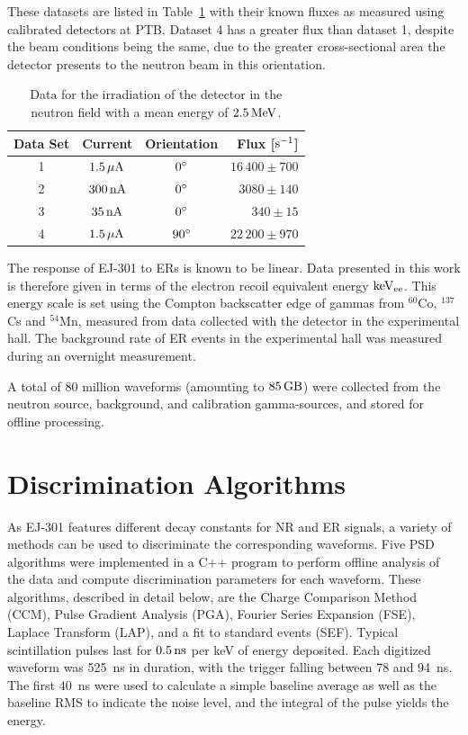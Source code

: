 These datasets are listed in Table~\ref{tab:psd_datasets} with their known fluxes as measured using calibrated detectors at PTB. Dataset 4 has a greater flux than dataset 1, despite the beam conditions being the same, due to the greater cross-sectional area the detector presents to the neutron beam in this orientation.

\begin{table}[htbp]
    \caption{Data for the irradiation of the detector in the neutron field with a mean energy of $2.5\,\mathrm{MeV}$. }\label{tab:psd_datasets}
\centering
    \begin{tabular}{c c c r }
        \hline
        Data Set & Current & Orientation & \;\; Flux [$\mathrm{s^{-1}}$] \\
        \hline
        1 & $1.5\,\mathrm{\mu A}$ & $0{}^{\circ}$ & \;$16\,400 \pm 700$ \\
        2 & $300\,\mathrm{nA}$ & $0{}^{\circ}$ & \;$3080 \pm 140$\\
        3 & $35\,\mathrm{nA}$ & $0{}^{\circ}$ & \;$340 \pm 15$\\
        4 & $1.5\,\mathrm{\mu A}$ & $90{}^{\circ}$ & \;$22\,200 \pm 970$\\
        \hline
    \end{tabular}
\end{table}

The response of EJ-301 to ERs is known to be linear. Data presented in this work is therefore given in terms of the electron recoil equivalent energy $\mathrm{keV_{ee}}$. This energy scale is set using the Compton backscatter edge of gammas from $^{60}$Co, $^{137}$Cs and $^{54}$Mn, measured from data collected with the detector in the experimental hall. The background rate of ER events in the experimental hall was measured during an overnight measurement.

A total of 80 million waveforms (amounting to $85\,\mathrm{GB}$) were collected from the neutron source, background, and calibration gamma-sources, and stored for offline processing.

\section{Discrimination Algorithms}\label{sec:algorithms}

As EJ-301 features different decay constants for NR and ER signals, a variety of methods can be used to discriminate the corresponding waveforms. Five PSD algorithms were implemented in a C++ program to perform offline analysis of the data and compute discrimination parameters for each waveform. These algorithms, described in detail below, are the Charge Comparison Method (CCM), Pulse Gradient Analysis (PGA), Fourier Series Expansion (FSE), Laplace Transform (LAP), and a fit to standard events (SEF). Typical scintillation pulses last for $0.5\,\mathrm{ns}$ per keV of energy deposited. Each digitized waveform was 525~ns in duration, with the trigger falling between 78 and 94~ns. The first 40~ns were used to calculate a simple baseline average as well as the baseline RMS to indicate the noise level, and the integral of the pulse yields the energy.

